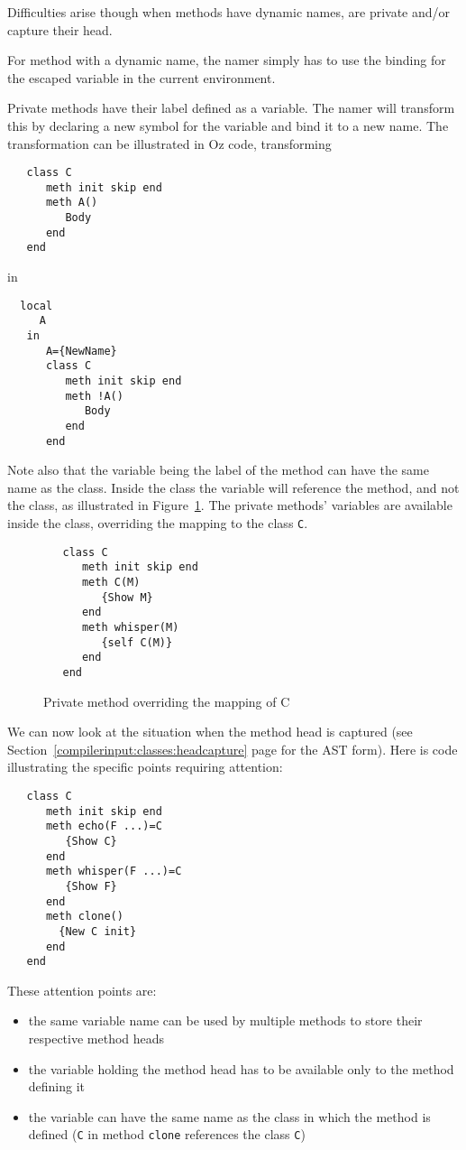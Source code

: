 \documentclass[a4paper]{memoir}
\begin{document}
Difficulties arise though when methods have dynamic names, are private and/or
capture their head.

For method with a dynamic name, the namer simply has to use the binding for the
escaped variable in the current environment.

Private methods have their label defined as a variable. The namer will transform this by 
declaring a new symbol for the variable and bind it to a new name.
The transformation can be illustrated in Oz code, transforming

\begin{lstlisting}
   class C
      meth init skip end
      meth A()
         Body
      end
   end
\end{lstlisting}

in

\begin{lstlisting}
  local
     A
   in
      A={NewName}
      class C
         meth init skip end
         meth !A()
            Body
         end
      end
\end{lstlisting}

Note also that the variable being the label of the method can have the same name
as the class. Inside the class the variable will reference the method, and not the class, 
as illustrated in Figure~\ref{fig:class_method_binding}. The private methods'
variables are available inside the class, overriding the mapping to the class
\lstinline!C!.
\begin{figure}[h]
\begin{lstlisting}
   class C
      meth init skip end
      meth C(M)
         {Show M}
      end
      meth whisper(M)
         {self C(M)}
      end
   end
\end{lstlisting}
\caption{Private method overriding the mapping of C}
\label{fig:class_method_binding}
\end{figure}



We can now look at the situation when the method head is captured (see
Section~\ref{compilerinput:classes:headcapture} page
\pageref{compilerinput:classes:headcapture} for the AST form).
Here is code illustrating the specific points requiring attention:
\begin{lstlisting}
   class C
      meth init skip end
      meth echo(F ...)=C
         {Show C}
      end
      meth whisper(F ...)=C
         {Show F}
      end
      meth clone()
        {New C init}
      end
   end
\end{lstlisting}
These attention points are:
\begin{itemize}
  \item the same variable name can be used by multiple methods to store their
    respective method heads
  \item the variable holding the method head has to be available only to the
    method defining it
  \item the variable can have the same name as the class in which the method is
    defined (\lstinline!C! in method \lstinline!clone! references the class \lstinline!C!)
\end{itemize}
\end{document}

